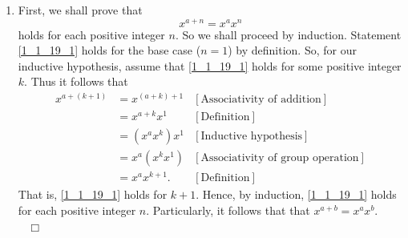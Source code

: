 \documentclass[9pt]{article}
\newcommand{\qed}{\hfill \ensuremath{\Box}}
\begin{document}
\begin{enumerate}
      \begin{enumerate}
         \item First, we shall prove that
               \begin{equation} \label{1_1_19_1}
                  x^{a+n} = x^ax^n 
               \end{equation}               
               holds for each positive integer $n$. So we shall proceed by
               induction. Statement \eqref{1_1_19_1} holds for the base
               case ($n = 1$) by definition. So, for our inductive hypothesis,
               assume that \eqref{1_1_19_1} holds for some positive integer $k$.
               Thus it follows that
               \begin{align*}
                  x^{a+(k+1)} &=x^{(a+k)+1}&[\text{Associativity of addition}]\\
                     &= x^{a+k}x^1  &[\text{Definition}] \\
                     &= (x^ax^k)x^1 &[\text{Inductive hypothesis}] \\
                     &= x^a(x^kx^1) &[\text{Associativity of group operation}]\\
                     &= x^ax^{k+1}.  &[\text{Definition}]
               \end{align*}
               That is, \eqref{1_1_19_1} holds for $k + 1$. Hence, by induction,
               \eqref{1_1_19_1} holds for each positive integer $n$.
               Particularly, it follows that that $x^{a+b} = x^ax^b$. \\
               \mbox{ } \qed \\
               

\end{enumerate}
\end{enumerate}
\end{document}
